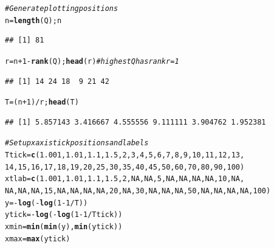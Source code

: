 \documentclass{tufte-handout}\usepackage[]{graphicx}\usepackage[]{xcolor}
\makeatletter
\newcommand{\hlnum}[1]{\textcolor[rgb]{0.686,0.059,0.569}{#1}}%
\newcommand{\hlcom}[1]{\textcolor[rgb]{0.678,0.584,0.686}{\textit{#1}}}%
\newcommand{\hlopt}[1]{\textcolor[rgb]{0,0,0}{#1}}%
\newcommand{\hlstd}[1]{\textcolor[rgb]{0.345,0.345,0.345}{#1}}%
\newcommand{\hlkwb}[1]{\textcolor[rgb]{0.69,0.353,0.396}{#1}}%
\newcommand{\hlkwd}[1]{\textcolor[rgb]{0.737,0.353,0.396}{\textbf{#1}}}%
\newenvironment{kframe}{%
 \def\at@end@of@kframe{}%
 \ifinner\ifhmode%
  \def\at@end@of@kframe{\end{minipage}}%
  \begin{minipage}{\columnwidth}%
 \fi\fi%
 \def\FrameCommand##1{\hskip\@totalleftmargin \hskip-\fboxsep
 \colorbox{shadecolor}{##1}\hskip-\fboxsep
     \hskip-\linewidth \hskip-\@totalleftmargin \hskip\columnwidth}%
 \MakeFramed {\advance\hsize-\width
   \@totalleftmargin\z@ \linewidth\hsize
   \@setminipage}}%
 {\par\unskip\endMakeFramed%
 \at@end@of@kframe}
\newenvironment{knitrout}{}{} %
\makeatother
\begin{document}
\begin{knitrout}
\begin{kframe}
\begin{alltt}
\hlcom{# Generate plotting positions}
\hlstd{n} \hlkwb{=} \hlkwd{length}\hlstd{(Q); n}
\end{alltt}
\begin{verbatim}
## [1] 81
\end{verbatim}
\begin{alltt}
\hlstd{r} \hlkwb{=} \hlstd{n} \hlopt{+} \hlnum{1} \hlopt{-} \hlkwd{rank}\hlstd{(Q);} \hlkwd{head}\hlstd{(r)}  \hlcom{# highest Q has rank r = 1}
\end{alltt}
\begin{verbatim}
## [1] 14 24 18  9 21 42
\end{verbatim}
\begin{alltt}
\hlstd{T} \hlkwb{=} \hlstd{(n} \hlopt{+} \hlnum{1}\hlstd{)}\hlopt{/}\hlstd{r;} \hlkwd{head}\hlstd{(T)}
\end{alltt}
\begin{verbatim}
## [1] 5.857143 3.416667 4.555556 9.111111 3.904762 1.952381
\end{verbatim}
\begin{alltt}
\hlcom{# Set up x axis tick positions and labels}
\hlstd{Ttick} \hlkwb{=} \hlkwd{c}\hlstd{(}\hlnum{1.001}\hlstd{,}\hlnum{1.01}\hlstd{,}\hlnum{1.1}\hlstd{,}\hlnum{1.5}\hlstd{,}\hlnum{2}\hlstd{,}\hlnum{3}\hlstd{,}\hlnum{4}\hlstd{,}\hlnum{5}\hlstd{,}\hlnum{6}\hlstd{,}\hlnum{7}\hlstd{,}\hlnum{8}\hlstd{,}\hlnum{9}\hlstd{,}\hlnum{10}\hlstd{,}\hlnum{11}\hlstd{,}\hlnum{12}\hlstd{,}\hlnum{13}\hlstd{,}
    \hlnum{14}\hlstd{,}\hlnum{15}\hlstd{,}\hlnum{16}\hlstd{,}\hlnum{17}\hlstd{,}\hlnum{18}\hlstd{,}\hlnum{19}\hlstd{,}\hlnum{20}\hlstd{,}\hlnum{25}\hlstd{,}\hlnum{30}\hlstd{,}\hlnum{35}\hlstd{,}\hlnum{40}\hlstd{,}\hlnum{45}\hlstd{,}\hlnum{50}\hlstd{,}\hlnum{60}\hlstd{,}\hlnum{70}\hlstd{,}\hlnum{80}\hlstd{,}\hlnum{90}\hlstd{,}\hlnum{100}\hlstd{)}
\hlstd{xtlab} \hlkwb{=} \hlkwd{c}\hlstd{(}\hlnum{1.001}\hlstd{,}\hlnum{1.01}\hlstd{,}\hlnum{1.1}\hlstd{,}\hlnum{1.5}\hlstd{,}\hlnum{2}\hlstd{,}\hlnum{NA}\hlstd{,}\hlnum{NA}\hlstd{,}\hlnum{5}\hlstd{,}\hlnum{NA}\hlstd{,}\hlnum{NA}\hlstd{,}\hlnum{NA}\hlstd{,}\hlnum{NA}\hlstd{,}\hlnum{10}\hlstd{,}\hlnum{NA}\hlstd{,}
    \hlnum{NA}\hlstd{,}\hlnum{NA}\hlstd{,}\hlnum{NA}\hlstd{,}\hlnum{15}\hlstd{,}\hlnum{NA}\hlstd{,}\hlnum{NA}\hlstd{,}\hlnum{NA}\hlstd{,}\hlnum{NA}\hlstd{,}\hlnum{20}\hlstd{,}\hlnum{NA}\hlstd{,}\hlnum{30}\hlstd{,}\hlnum{NA}\hlstd{,}\hlnum{NA}\hlstd{,}\hlnum{NA}\hlstd{,}\hlnum{50}\hlstd{,}\hlnum{NA}\hlstd{,}\hlnum{NA}\hlstd{,}\hlnum{NA}\hlstd{,}\hlnum{NA}\hlstd{,}\hlnum{100}\hlstd{)}
\hlstd{y} \hlkwb{=} \hlopt{-}\hlkwd{log}\hlstd{(}\hlopt{-}\hlkwd{log}\hlstd{(}\hlnum{1} \hlopt{-} \hlnum{1}\hlopt{/}\hlstd{T))}
\hlstd{ytick} \hlkwb{=} \hlopt{-}\hlkwd{log}\hlstd{(}\hlopt{-}\hlkwd{log}\hlstd{(}\hlnum{1} \hlopt{-} \hlnum{1}\hlopt{/}\hlstd{Ttick))}
\hlstd{xmin} \hlkwb{=} \hlkwd{min}\hlstd{(}\hlkwd{min}\hlstd{(y),}\hlkwd{min}\hlstd{(ytick))}
\hlstd{xmax} \hlkwb{=} \hlkwd{max}\hlstd{(ytick)}


\end{alltt}
\end{kframe}
\end{knitrout}
\end{document}
